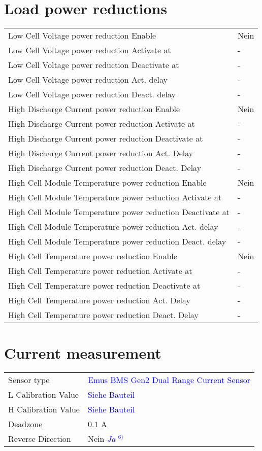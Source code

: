 \section*{Load power reductions}
\begin{tabular}{p{11cm}p{2cm}}
	Low Cell Voltage power reduction Enable & Nein \\
	Low Cell Voltage power reduction Activate at & - \\
	Low Cell Voltage power reduction Deactivate at & - \\
	Low Cell Voltage power reduction Act. delay & - \\
	Low Cell Voltage power reduction Deact. delay & - \\
	High Discharge Current power reduction Enable & Nein \\
	High Discharge Current power reduction Activate at & - \\
	High Discharge Current power reduction Deactivate at & - \\
	High Discharge Current power reduction Act. Delay & - \\
	High Discharge Current power reduction Deact. Delay & - \\
	High Cell Module Temperature power reduction Enable & Nein \\
	High Cell Module Temperature power reduction Activate at & - \\
	High Cell Module Temperature power reduction Deactivate at & - \\
	High Cell Module Temperature power reduction Act. delay & - \\
	High Cell Module Temperature power reduction Deact. delay & - \\
	High Cell Temperature power reduction Enable & Nein \\
	High Cell Temperature power reduction Activate at & - \\
	High Cell Temperature power reduction Deactivate at & - \\
	High Cell Temperature power reduction Act. Delay & - \\
	High Cell Temperature power reduction Deact. Delay & - \\
\end{tabular}

\section*{Current measurement}
\begin{tabular}{p{11cm}p{4cm}}
	Sensor type & \textcolor{blue}{Emus BMS Gen2 Dual Range Current Sensor} \\
	L Calibration Value & \textcolor{blue}{Siehe Bauteil} \\
	H Calibration Value & \textcolor{blue}{Siehe Bauteil} \\
	Deadzone & $0.1$ A \\
	Reverse Direction & Nein \textcolor{blue}{\textit{Ja} $^{6)}$}
\end{tabular}

